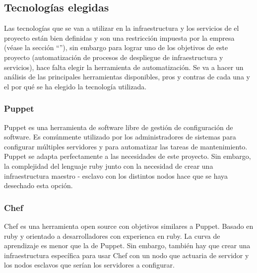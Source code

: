 	\subsection{Tecnologías elegidas}
	\label{tecnologias_elegidas}
		\begin{text}
			Las tecnologías que se van a utilizar en la infraestructura y los servicios de el proyecto están bien definidas y son una restricción impuesta por la empresa (véase la sección ``''), sin embargo para lograr uno de los objetivos de este proyecto (automatización de procesos de despliegue de infraestructura y servicios), hace falta elegir la herramienta de automatización. Se va a hacer un análisis de las principales herramientas disponibles, pros y contras de cada una y el por qué se ha elegido la tecnología utilizada. \cite{comparadorAnsibleChefPuppet:online}
		\end{text}
	\subsubsection{Puppet}
		\begin{text}
			Puppet es una herramienta de software libre de gestión de configuración de software. Es comúnmente utilizado por los administradores de sistemas para configurar múltiples servidores y para automatizar las tareas de mantenimiento. Puppet se adapta perfectamente a las necesidades de este proyecto. Sin embargo, la complejidad del lenguaje ruby junto con la necesidad de crear una infraestructura maestro - esclavo con los distintos nodos hace que se haya desechado esta opción. \cite{puppet:online}
		\end{text}
		\clearpage
	\subsubsection{Chef}
		\begin{text}
			Chef es una herramienta open source con objetivos similares a Puppet. Basado en ruby y orientado a desarrolladores con experienca en ruby. La curva de aprendizaje es menor que la de Puppet. Sin embargo, también hay que crear una infraestructura específica para usar Chef con un nodo que actuaria de servidor y los nodos esclavos que serían los servidores a configurar. \cite{chef:online}
		\end{text}
